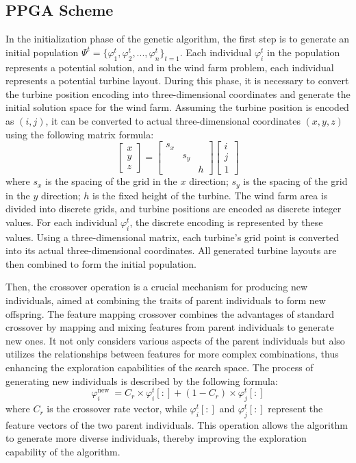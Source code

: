 \documentclass[journal,twoside]{IEEEtran}
\begin{document}
\subsection{PPGA Scheme}
In the initialization phase of the genetic algorithm, the first step is to generate an initial population $\Psi^t= \{\varphi^{t}_1,\varphi^{t}_2, ..., \varphi^{t}_n \}_{t=1}$. Each individual $\varphi_i^{t}$ in the population represents a potential solution, and in the wind farm problem, each individual represents a potential turbine layout. During this phase, it is necessary to convert the turbine position encoding into three-dimensional coordinates and generate the initial solution space for the wind farm. Assuming the turbine position is encoded as $(i,j)$, it can be converted to actual three-dimensional coordinates $(x,y,z)$ using the following matrix formula:
\begin{equation}\label{E15}
\begin{bmatrix}
	x \\
	y \\
	z
\end{bmatrix}
=
\begin{bmatrix}
	s_x &  &  \\
	 & s_y & \\
	 &  & h
\end{bmatrix}
\begin{bmatrix}
	i \\
	j \\
	1
\end{bmatrix}
\end{equation}
where $s_x$ is the spacing of the grid in the $x$ direction; $s_y$ is the spacing of the grid in the $y$ direction; $h$ is the fixed height of the turbine. The wind farm area is divided into discrete grids, and turbine positions are encoded as discrete integer values. For each individual $\varphi_i^{t}$, the discrete encoding is represented by these values. Using a three-dimensional matrix, each turbine's grid point is converted into its actual three-dimensional coordinates. All generated turbine layouts are then combined to form the initial population.

Then, the crossover operation is a crucial mechanism for producing new individuals, aimed at combining the traits of parent individuals to form new offspring. The feature mapping crossover combines the advantages of standard crossover by mapping and mixing features from parent individuals to generate new ones. It not only considers various aspects of the parent individuals but also utilizes the relationships between features for more complex combinations, thus enhancing the exploration capabilities of the search space. The process of generating new individuals is described by the following formula:
\begin{equation}\label{E16}
	\varphi_i^{\text {new }}=C_r \times \varphi^t_i[:]+ (1-C_r) \times \varphi^t_j[:]
\end{equation}
where $C_r$ is the crossover rate vector, while $\varphi^t_i[:]$ and $\varphi^t_j[:]$ represent the feature vectors of the two parent individuals. This operation allows the algorithm to generate more diverse individuals, thereby improving the exploration capability of the algorithm.
\end{document}
